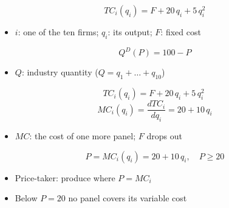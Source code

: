 \documentclass{beamer}
\begin{document}
\begin{frame}[plain,label=w3_setup_tc]
  \Large
  \[
    \tag{1}\;TC_i(q_i) = F + 20\,q_i + 5\,q_i^2
  \]
  \vspace{0.3em}
  \begin{itemize}\Large
    \item $i$: one of the ten firms; $q_i$: its output; $F$: fixed cost
  \end{itemize}
\end{frame}

\begin{frame}[plain,label=w3_setup_demand]
  \Large
  \[
    \tag{2}\;Q^D(P) = 100 - P
  \]
  \vspace{0.3em}
  \begin{itemize}\Large
    \item $Q$: industry quantity ($Q = q_1 + \dots + q_{10}$)
  \end{itemize}
\end{frame}

\begin{frame}[plain,label=w3_wt1_mc]
  \Large
  \[
    TC_i(q_i) = F + 20\,q_i + 5\,q_i^2
  \]
  \[
    \tag{3}\;MC_i(q_i) = \frac{dTC_i}{dq_i} = 20 + 10\,q_i
  \]
  \vspace{0.3em}
  \begin{itemize}\Large
    \item $MC$: the cost of one more panel; $F$ drops out
  \end{itemize}
\end{frame}

\begin{frame}[plain,label=w3_wt1_rule]
  \Large
  \[
    \tag{4}\;P = MC_i(q_i) = 20 + 10\,q_i, \quad P \ge 20
  \]
  \vspace{0.3em}
  \begin{itemize}\Large
    \item Price-taker: produce where $P = MC_i$
    \item Below $P = 20$ no panel covers its variable cost
  \end{itemize}
\end{frame}
\end{document}
